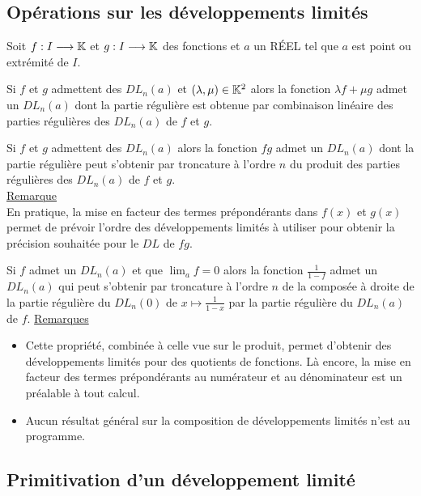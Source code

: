 \subsection{Opérations sur les développements limités}
Soit \(f : I \longrightarrow  \mathbb{K}\) et \(g : I \longrightarrow  \mathbb{K}\) des fonctions et \(a\) un RÉEL tel que \(a\) est point ou extrémité de \(I\).

\begin{defprop}
    Si \(f\) et \(g\) admettent des \(DL_n(a)\) et \((\lambda , \mu) \in  \mathbb{K}^2\) alors la fonction \(\lambda f + \mu g\) admet un \(DL_n(a)\) dont la partie régulière est obtenue par combinaison linéaire des parties régulières des \(DL_n(a)\) de \(f \) et \(g\).
\end{defprop}

\begin{defprop}[Produit]
    Si \(f\) et \(g\) admettent des \(DL_n(a)\) alors la fonction \(f g\) admet un \(DL_n(a)\) dont la partie régulière peut s’obtenir par troncature à l’ordre \(n\) du produit des parties régulières des \(DL_n(a)\) de \(f\) et \(g\).\\
    \underline{Remarque}\\
    En pratique, la mise en facteur des termes prépondérants dans \(f (x)\) et \(g(x)\) permet de prévoir l’ordre des développements limités à utiliser pour obtenir la précision souhaitée pour le \(DL\) de \(f g\).
\end{defprop}

\begin{defprop}
    Si \(f\) admet un \(DL_n(a)\) et que \(\lim_{a} f = 0\) alors la fonction \(\frac{1}{1 - f}\) admet un \(DL_n(a)\) qui peut s’obtenir par troncature à l’ordre \(n\) de la composée à droite de la partie régulière du \(DL_n(0)\) de \(x \mapsto  \frac{1}{1 - x}\) par la partie régulière du \(DL_n(a)\) de \(f\).
    \underline{Remarques}
    \begin{itemize}
    \item Cette propriété, combinée à celle vue sur le produit, permet d’obtenir des développements limités pour des quotients de fonctions. Là encore, la mise en facteur des termes prépondérants au numérateur et au dénominateur est un préalable à tout calcul.
    \item Aucun résultat général sur la composition de développements limités n’est au programme.
    \end{itemize}
\end{defprop}
\subsection{Primitivation d’un développement limité}

